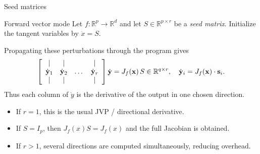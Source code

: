 \documentclass[12pt,xcolor={table}]{beamer}
\newcommand{\sbf}{{\bf s}}
\newcommand{\xbf}{{\bf x}}
\newcommand{\ybf}{{\bf y}}
\begin{document}
\begin{frame}{Seed matrices}
  \begin{block}{Forward vector mode}
    Let $f:\mathbb{R}^p \to \mathbb{R}^d$ and let $S \in \mathbb{R}^{p\times r}$ be a \emph{seed matrix}.
    Initialize the tangent variables by
    $
    \dot{x} = S.
    $

    Propagating these perturbations through the program gives
    $$
     \left[ \begin{array}{cccc} | & | & & | \\ \dot{\ybf}_1 & \dot{\ybf}_2 & \dots & \dot{\ybf}_r \\ | & | & & | \end{array} \right]\dot{\ybf} = J_f(\xbf)\,S \in \mathbb{R}^{q\times r}, \quad \dot{\ybf}_i = J_f(\xbf) \cdot \sbf_i.
    $$
    Thus each column of $\dot{y}$ is the derivative of the output in one chosen direction.

    \begin{itemize}
      \item If $r=1$, this is the usual JVP / directional derivative.
      \item If $S=I_p$, then $J_f(x)S = J_f(x)$ and the full Jacobian is obtained.
      \item If $r>1$, several directions are computed simultaneously, reducing overhead.
    \end{itemize}
  \end{block}
\end{frame}
\end{document}
